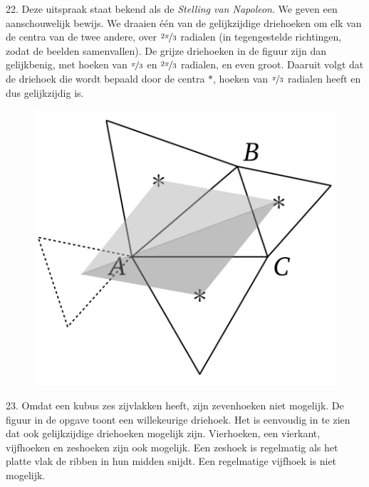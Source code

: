 \begin{problem}{22.}
    Deze uitspraak staat bekend als de \textit{Stelling van Napoleon}. We geven een aanschouwelijk bewijs. We draaien één van de gelijkzijdige driehoeken om elk van de centra van de twee andere, over $\nicefrac{2 \pi}{3}$ radialen (in tegengestelde richtingen, zodat de beelden samenvallen). De grijze driehoeken in de figuur zijn dan gelijkbenig, met hoeken van $\nicefrac{\pi}{3}$ en $\nicefrac{2 \pi}{3}$ radialen, en even groot. Daaruit volgt dat de driehoek die wordt bepaald door de centra $*$, hoeken van $\nicefrac{\pi}{3}$ radialen heeft en dus gelijk\-zijdig is.
    \begin{figure}
		\includegraphics[scale=0.15]{resources/oplossing22}
	\end{figure}
\end{problem}

\clearpage

\begin{problem}{23.}
    Omdat een kubus zes zijvlakken heeft, zijn zevenhoeken niet mogelijk. De figuur in de opgave toont een willekeurige driehoek. Het is eenvoudig in te zien dat ook gelijkzijdige driehoeken mogelijk zijn. Vierhoeken, een vierkant, vijfhoeken en zeshoeken zijn ook mogelijk. Een zeshoek is regelmatig als het platte vlak de ribben in hun midden snijdt. Een regelmatige vijfhoek is niet mogelijk.
\end{problem}

